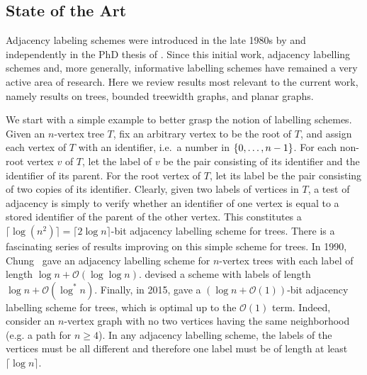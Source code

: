 \documentclass{patmorin}
\renewcommand{\geq}{\geqslant}
\newcommand{\vida}[1]{\noindent{\color{pink} VD: #1}}
\newcommand{\pat}[1]{\noindent\textcolor{Magenta}{PaMo: #1}}
\newcommand{\Oh}{\mathcal{O}}
\DeclarePairedDelimiter{\set}{\{}{\}}
\begin{document}
\subsection{State of the Art}
\label{ssec:state-of-art}

Adjacency labeling schemes were introduced in the late 1980s
by \citet{kannan.naor.ea:implicit} and independently in the PhD thesis of \citet{muller:local}. Since this initial work, adjacency labelling schemes and, more generally, informative labelling schemes have remained a very active area of research.
Here we review results most relevant to the current work, namely results on trees, bounded treewidth graphs, and planar
graphs.

We start with a simple example to better grasp the notion of labelling schemes.
Given an $n$-vertex tree $T$, fix an arbitrary vertex to be the root of $T$, and assign each vertex of $T$ with an identifier, i.e.\ a number in $\set{0,\ldots,n-1}$.
For each non-root vertex $v$ of $T$,
let the label of $v$ be
the pair consisting of its identifier and the identifier of its parent.
For the root vertex of $T$, let its label be
the pair consisting of two copies of its identifier.
Clearly, given two labels of vertices in $T$,
a test of adjacency is simply to verify whether an identifier of one vertex is equal to a stored identifier of the parent of the other vertex.
This constitutes a $\lceil\log(n^2)\rceil=\lceil2\log n\rceil$-bit adjacency labelling scheme for trees.
There is a fascinating series of results improving on this simple scheme for trees. In 1990, Chung~\cite{chung:universal} gave an adjacency labelling scheme for $n$-vertex trees with each label of length $\log n +\Oh(\log\log n)$.
\citet{alstrup.rauhe:improved} devised a scheme with labels of length $\log n+\Oh(\log^*n)$.
Finally, in 2015,
\citet{alstrup.dahlgaard.ea:optimal} gave a $(\log n + \Oh(1))$-bit adjacency labelling scheme for trees, which is optimal up to the $\Oh(1)$ term.
Indeed, consider an $n$-vertex graph with no two vertices having the same neighborhood (e.g. a path for $n\geq4$).
In any adjacency labelling scheme,
the labels of the vertices must be all different and therefore one label must be of length at least $\lceil\log n\rceil$.
\end{document}
